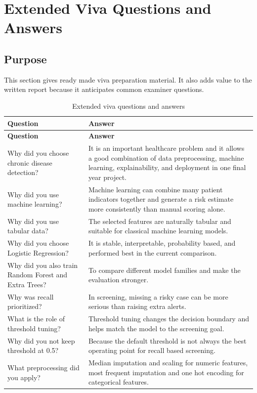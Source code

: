 \documentclass[12pt,a4paper,openany]{report}
\begin{document}
    \chapter{Extended Viva Questions and Answers}
    \section{Purpose}
    This section gives ready made viva preparation material. It also adds value to the written report because it anticipates common examiner questions.

    \begin{longtable}{p{6cm} p{8cm}}
    \caption{Extended viva questions and answers} \\
    \toprule
    \textbf{Question} & \textbf{Answer} \\
    \midrule
    \endfirsthead
    \toprule
    \textbf{Question} & \textbf{Answer} \\
    \midrule
    \endhead
    Why did you choose chronic disease detection? & It is an important healthcare problem and it allows a good combination of data preprocessing, machine learning, explainability, and deployment in one final year project. \\
    Why did you use machine learning? & Machine learning can combine many patient indicators together and generate a risk estimate more consistently than manual scoring alone. \\
    Why did you use tabular data? & The selected features are naturally tabular and suitable for classical machine learning models. \\
    Why did you choose Logistic Regression? & It is stable, interpretable, probability based, and performed best in the current comparison. \\
    Why did you also train Random Forest and Extra Trees? & To compare different model families and make the evaluation stronger. \\
    Why was recall prioritized? & In screening, missing a risky case can be more serious than raising extra alerts. \\
    What is the role of threshold tuning? & Threshold tuning changes the decision boundary and helps match the model to the screening goal. \\
    Why did you not keep threshold at 0.5? & Because the default threshold is not always the best operating point for recall based screening. \\
    What preprocessing did you apply? & Median imputation and scaling for numeric features, most frequent imputation and one hot encoding for categorical features. \\

\end{longtable}
\end{document}
